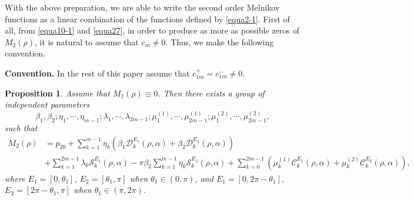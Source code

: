 \documentclass[11pt]{amsart}
\newtheorem{prop}[thm]{Proposition}
\theoremstyle{remark}
\theoremstyle{definition}
\begin{document}
With the above preparation,  we are able to write the second order Melnikov functions as a linear combination of the functions defined by \eqref{equa2-1}.
First of all, from \eqref{equa10-1}   and \eqref{equa27}, in order to produce as more as possible  zeros of $M_2(\rho)$, it is natural to assume that $c_m\neq 0$.
Thus, we make the following convention.

{\bf {Convention}.} In the rest of this paper assume that $c_{1m}^+=c_{1m}^-\neq 0$.




\begin{prop} \label{prop5}  Assume  that   $M_1(\rho)\equiv 0$.  Then  there exists a group of independent parameters
\begin{equation} \label{freepar-1}\beta_1, \beta_2; \eta_1,\cdots,\eta_{m-1};\lambda_1, \cdots,\lambda_{2m-1}; \mu_1^{(1)}, \cdots,\mu_{2m-1}^{(1)};  \mu_1^{(2)}, \cdots,\mu_{2m-1}^{(2)},\end{equation}
  such that
\begin{equation} \label{equam2pro-3}
\begin{split}
M_2(\rho)&=p_{20}+\sum_{k=1}^{m-1}\eta_{k}\left(\beta_1\mathcal{D}_{k}^{E_1}(\rho,\alpha)+\beta_2\mathcal{D}_{k}^{E_2}(\rho,\alpha)\right)\\
&+\sum_{k=1}^{2m-1}\lambda_k\mathcal{S}_{k}^{E_1}(\rho,\alpha)  -\pi\beta_2\sum_{k=1}^{m-1}\eta_{k}\mathcal{S}_{k}^{E_2}(\rho,\alpha)
+\sum_{k=0}^{2m-1}\left(\mu_k^{(1)}\mathcal{C}_{k}^{E_1}(\rho,\alpha)+\mu_k^{(2)}\mathcal{C}_{k}^{E_2}(\rho,\alpha)\right),
\end{split}\end{equation}
where $E_1=[0,\theta_1]$, $E_2=[\theta_1, \pi]$ when $\theta_1\in (0,\pi)$, and  $E_1=[0,2\pi-\theta_1]$, $E_2=[2\pi-\theta_1, \pi]$ when $\theta_1\in (\pi, 2\pi)$.
\end{prop}
\end{document}
